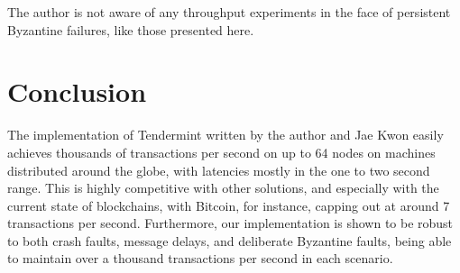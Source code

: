 The author is not aware of any throughput experiments in the face of persistent Byzantine failures,
like those presented here.

\section{Conclusion}

The implementation of Tendermint written by the author and Jae Kwon easily achieves 
thousands of transactions per second on up to 64 nodes on machines distributed around the globe, 
with latencies mostly in the one to two second range.
This is highly competitive with other solutions, and especially with the current state of blockchains,
with Bitcoin, for instance, capping out at around 7 transactions per second.
Furthermore, our implementation is shown to be robust to both crash faults, message delays,
and deliberate Byzantine faults,
being able to maintain over a thousand transactions per second in each scenario.


